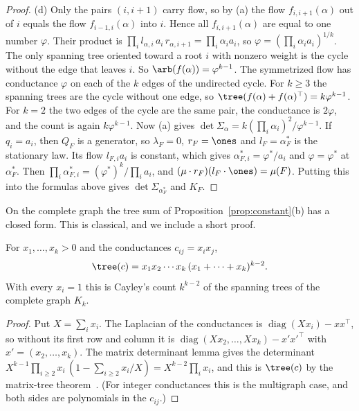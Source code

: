 \begin{proof}
(d) Only the pairs $(i,i+1)$ carry flow, so by (a) the flow $f_{i,i+1}(\alpha)$ out of $i$
equals the flow $f_{i-1,i}(\alpha)$ into $i$. Hence all $f_{i,i+1}(\alpha)$ are equal to one
number $\varphi$. Their product is
$\prod_il_{\alpha,i}\,a_i\,r_{\alpha,i+1}=\prod_i\alpha_ia_i$, so
$\varphi=(\prod_i\alpha_ia_i)^{1/k}$. The only spanning tree oriented toward a root $i$ with
nonzero weight is the cycle without the edge that leaves $i$. So
$\arb(f(\alpha))=\varphi^{k-1}$.
The symmetrized flow has conductance $\varphi$ on each of the $k$ edges of the undirected cycle.
For $k\ge3$ the spanning trees are the cycle without one edge, so
$\tree(f(\alpha)+f(\alpha)^\top)=k\varphi^{k-1}$. For $k=2$ the two edges of the cycle are the
same pair, the conductance is $2\varphi$, and the count is again $k\varphi^{k-1}$. Now (a) gives
$\det\Sigma_\alpha=k(\prod_i\alpha_i)^2/\varphi^{k-1}$. If $q_i=a_i$, then $Q_F$ is a generator,
so $\lambda_F=0$, $r_F=\ones$ and $l_F=\alpha^*_F$ is the stationary law. Its flow $l_{F,i}a_i$
is constant, which gives $\alpha^*_{F,i}=\varphi^*/a_i$ and $\varphi=\varphi^*$ at $\alpha^*_F$. Then
$\prod_i\alpha^*_{F,i}=(\varphi^*)^k/\prod_ia_i$, and $(\mu\cdot r_F)(l_F\cdot\ones)=\mu(F)$. Putting
this into the formulas above gives $\det\Sigma_{\alpha^*_F}$ and $K_F$.
\end{proof}


On the complete graph the tree sum of Proposition~\ref{prop:constant}(b) has a closed
form. This is classical, and we include a short proof.

\begin{lemma}\label{lem:weighted-cayley}
For $x_1,\ldots,x_k>0$ and the conductances $c_{ij}=x_ix_j$,
\[
\tree(c)=x_1x_2\cdots x_k\,(x_1+\cdots+x_k)^{k-2}.
\]
With every $x_i=1$ this is Cayley's count $k^{k-2}$ of the spanning trees of
the complete graph $K_k$.
\end{lemma}

\begin{proof}
Put $X=\sum_ix_i$. The Laplacian of the conductances is $\operatorname{diag}(Xx_i)-xx^\top$,
so without its first row and column it is
$\operatorname{diag}(Xx_2,\ldots,Xx_k)-x'x'^\top$ with $x'=(x_2,\ldots,x_k)$. The
matrix determinant lemma gives the determinant
$X^{k-1}\prod_{i\ge2}x_i\,(1-\sum_{i\ge2}x_i/X)=X^{k-2}\prod_ix_i$, and this is
$\tree(c)$ by the matrix-tree theorem~\cite{bollobas1998}. (For integer conductances
this is the multigraph case, and both sides are polynomials in the $c_{ij}$.)
\end{proof}

